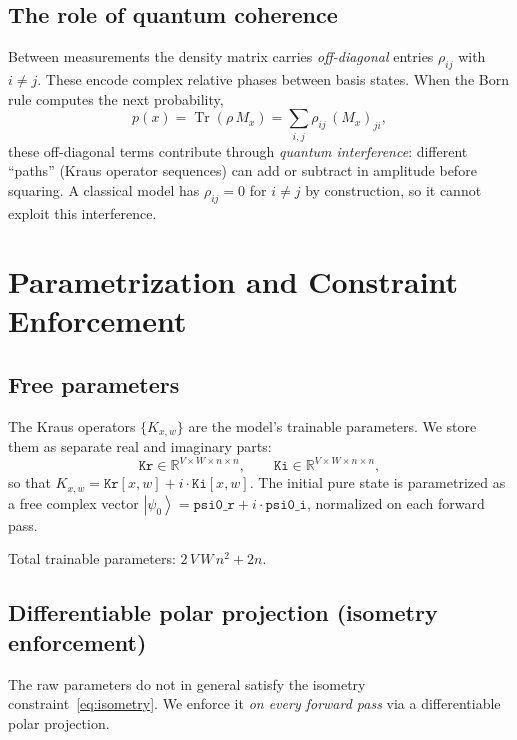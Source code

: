 \documentclass[11pt,a4paper]{article}
\newcommand{\Tr}{\operatorname{Tr}}
\newcommand{\ket}[1]{\left|#1\right\rangle}
\newcommand{\RR}{\mathbb{R}}
\newcommand{\Kx}[2]{K_{#1,#2}}     %
\newcommand{\Mx}[1]{M_{#1}}         %
\theoremstyle{plain}
\begin{document}
\subsection{The role of quantum coherence}

Between measurements the density matrix carries \emph{off-diagonal}
entries $\rho_{ij}$ with $i\neq j$. These encode complex relative
phases between basis states. When the Born rule computes the next
probability,
\[
  p(x) = \Tr(\rho\,\Mx{x})
       = \sum_{i,j} \rho_{ij}\,(\Mx{x})_{ji},
\]
these off-diagonal terms contribute through \emph{quantum interference}:
different ``paths'' (Kraus operator sequences) can add or subtract in
amplitude before squaring. A classical model has $\rho_{ij}=0$ for
$i\neq j$ by construction, so it cannot exploit this interference.

\section{Parametrization and Constraint Enforcement}

\subsection{Free parameters}

The Kraus operators $\{\Kx{x}{w}\}$ are the model's trainable
parameters. We store them as separate real and imaginary parts:
\[
  \mathtt{Kr} \in \RR^{V\times W\times n\times n}, \qquad
  \mathtt{Ki} \in \RR^{V\times W\times n\times n},
\]
so that $\Kx{x}{w} = \mathtt{Kr}[x,w] + i\cdot\mathtt{Ki}[x,w]$. The
initial pure state is parametrized as a free complex vector
$\ket{\psi_0} = \mathtt{psi0\_r} + i\cdot\mathtt{psi0\_i}$,
normalized on each forward pass.

Total trainable parameters: $2\,V\,W\,n^2 + 2n$.

\subsection{Differentiable polar projection (isometry enforcement)}

The raw parameters do not in general satisfy the isometry
constraint~\eqref{eq:isometry}. We enforce it \emph{on every forward
pass} via a differentiable polar projection.
\end{document}
